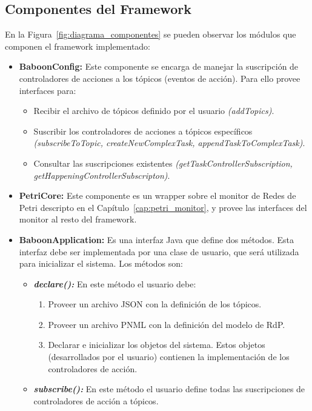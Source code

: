 \subsection{Componentes del Framework}
En la Figura~\ref{fig:diagrama_componentes} se pueden observar los
módulos que componen el framework implementado:
\begin{itemize}
  \item \textbf{BaboonConfig: } Este componente se encarga de manejar la
  suscripción de controladores de acciones a los tópicos (eventos de acción).
  Para ello provee interfaces para:
	  \begin{itemize}
	    \item Recibir el archivo de tópicos definido por el usuario
	    \emph{(addTopics)}.
	    \item Suscribir los controladores de acciones a tópicos específicos
	    \emph{(subscribeToTopic, createNewComplexTask, appendTaskToComplexTask)}.
	    \item Consultar las suscripciones existentes
	    \emph{(getTaskControllerSubscription,
	    getHappeningControllerSubscripton)}.
	  \end{itemize}
	  
  \item \textbf{PetriCore: } Este componente es un wrapper sobre el monitor de
  Redes de Petri descripto en el
  Capítulo~\ref{cap:petri_monitor}, y provee las interfaces del
  monitor al resto del framework.
  
  \item \textbf{BaboonApplication: } Es una interfaz Java que define dos
  métodos. Esta interfaz debe ser implementada por una clase de usuario, que
  será utilizada para inicializar el sistema. Los métodos son:
  \begin{itemize}
    \item \textbf{\emph{declare(): }} En este método el usuario debe:
    	\begin{enumerate}
    	  \item Proveer un archivo JSON con la definición de los tópicos.
    	  \item Proveer un archivo PNML con la definición del modelo de RdP.
    	  \item Declarar e inicializar los objetos del sistema. Estos objetos
    	  (desarrollados por el usuario) contienen la implementación
    	  de los controladores de acción.
    	\end{enumerate}
    \item \textbf{\emph{subscribe(): }} En este método el usuario define todas
    las suscripciones de controladores de acción a tópicos.
   \end{itemize}
   

\end{itemize}
